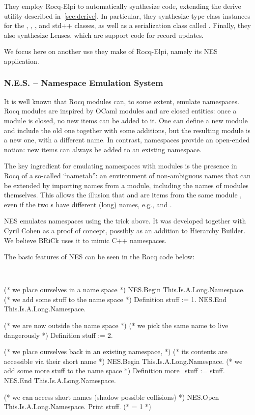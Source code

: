 \documentclass[a4paper, 11pt]{book}
\newenvironment{rocqcode}
  {\VerbatimEnvironment~\\\begin{rocqbox}\begin{xrocqcode}}{\end{xrocqcode}
\end{rocqbox}\\}
\begin{document}
They employ Rocq-Elpi to automatically synthesize code, extending the derive
utility described in~\cref{sec:derive}. In particular, they synthesize type
class instances for the , , ,
and  std++ classes, as well as a serialization class called
. Finally, they also synthesize Lenses, which are support code for
record updates.

We focus here on another use they make of Rocq-Elpi, namely its NES
application.

\subsubsection{N.E.S. -- Namespace Emulation System}

It is well known that Rocq modules can, to some extent, emulate namespaces.
Rocq modules are inspired by OCaml modules and are closed entities: once a
module is closed, no new items can be added to it. One can define a new module
and include the old one together with some additions, but the resulting module
is a new one, with a different name. In contrast, namespaces provide an
open-ended notion: new items can always be added to an existing namespace.

The key ingredient for emulating namespaces with modules is the presence in
Rocq of a so-called ``nametab'': an environment of non-ambiguous names that can
be extended by importing names from a module, including the names of modules
themselves. This allows the illusion that  and  are items
from the same module , even if the two s have different (long)
names, e.g.,  and .

NES emulates namespaces using the trick above. It was developed together with
Cyril Cohen as a proof of concept, possibly as an addition to Hierarchy
Builder. We believe BRiCk uses it to mimic C++ namespaces.

The basic features of NES can be seen in the Rocq code below:

\begin{rocqcode}
(* we place ourselves in a name space *)
NES.Begin This.Is.A.Long.Namespace.
  (* we add some stuff to the name space *)
  Definition stuff := 1.
NES.End This.Is.A.Long.Namespace.

(* we are now outside the name space *)
(* we pick the same name to live dangerously *)
Definition stuff := 2.

(* we place ourselves back in an existing namespace, *)
(* its contents are accessible via their short name *)
NES.Begin This.Is.A.Long.Namespace.
  (* we add some more stuff to the name space *)
  Definition more_stuff := stuff.
NES.End This.Is.A.Long.Namespace.

(* we can access short names (shadow possible collisions) *)
NES.Open This.Is.A.Long.Namespace.
Print stuff. (* = 1 *)
\end{rocqcode}
\end{document}
